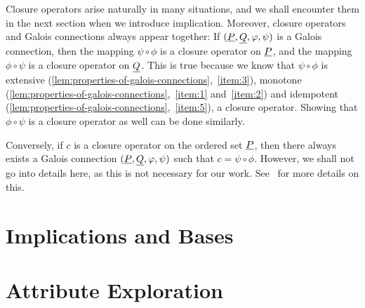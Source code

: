 Closure operators arise naturally in many situations, and we shall encounter them in the
next section when we introduce implication.  Moreover, closure operators and Galois
connections always appear together: If $({\underline{P}}, {\underline{Q}}, \varphi, \psi)$ is a Galois
connection, then the mapping $\psi \circ \phi$ is a closure operator on ${\underline{P}}$, and the
mapping $\phi \circ \psi$ is a closure operator on ${\underline{Q}}$.  This is true because we know
that $\psi \circ \phi$ is extensive
(\ref{lem:properties-of-galois-connections},~\ref{item:3}), monotone
(\ref{lem:properties-of-galois-connections},~\ref{item:1} and~\ref{item:2}) and idempotent
(\ref{lem:properties-of-galois-connections},~\ref{item:5}), \ie a closure operator.
Showing that $\phi \circ \psi$ is a closure operator as well can be done similarly.

Conversely, if $c$ is a closure operator on the ordered set ${\underline{P}}$, then there always
exists a Galois connection $({\underline{P}}, {\underline{Q}}, \varphi, \psi)$ such that $c = \psi \circ \phi$.
However, we shall not go into details here, as this is not necessary for our work.
See~\cite{fca-book} for more details on this.

\section{Implications and Bases}
\label{sec:implications-sets}

%
%
%
%
%

\section{Attribute Exploration}
\label{sec:attr-expl}

%
%


